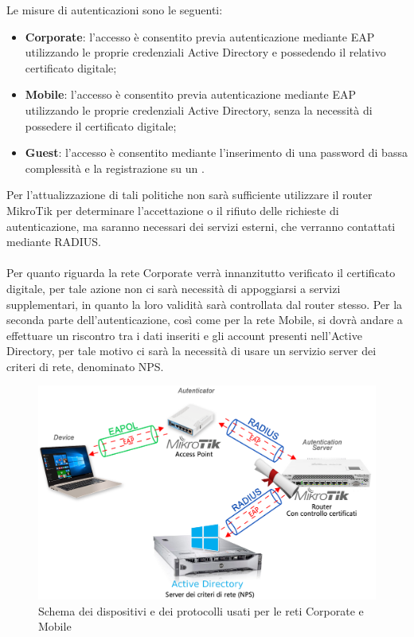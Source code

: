 \documentclass[Realizzazione.tex]{subfiles}
\begin{document}
Le misure di autenticazioni sono le seguenti:
\begin{itemize}
	\item \textbf{Corporate}: l'accesso è consentito previa autenticazione mediante EAP utilizzando le proprie credenziali Active Directory e possedendo il relativo certificato digitale;
	\item \textbf{Mobile}: l'accesso è consentito previa autenticazione mediante EAP utilizzando le proprie credenziali Active Directory, senza la necessità di possedere il certificato digitale;
	\item \textbf{Guest}: l'accesso è consentito mediante l'inserimento di una password di bassa complessità e la registrazione su un .
\end{itemize}

Per l'attualizzazione di tali politiche non sarà sufficiente utilizzare il router MikroTik per determinare l'accettazione o il rifiuto delle richieste di autenticazione, ma saranno necessari dei servizi esterni, che verranno contattati mediante RADIUS. \\\\
Per quanto riguarda la rete Corporate verrà innanzitutto verificato il certificato digitale, per tale azione non ci sarà necessità di appoggiarsi a servizi supplementari, in quanto la loro validità sarà controllata dal router stesso. Per la seconda parte dell'autenticazione, così come per la rete Mobile, si dovrà andare a effettuare un riscontro tra i dati inseriti e gli account presenti nell'Active Directory, per tale motivo ci sarà la necessità di usare un servizio server dei criteri di rete, denominato NPS.
\begin{figure}[H]
	\centering
	\includegraphics[width=1.1\linewidth]{"images/Schema_tecnologie_NPS"}
	\caption{Schema dei dispositivi e dei protocolli usati per le reti Corporate e Mobile}
	\label{fig:Schema dei dispositivi e dei protocolli usati per le reti Corporate e Mobile}
\end{figure}
\end{document}
